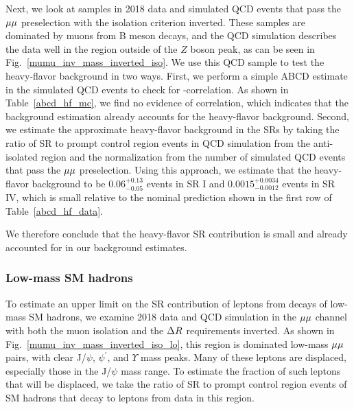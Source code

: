 Next, we look at samples in 2018 data and simulated QCD events that pass the ${\mu}{\mu}$ preselection with the isolation criterion inverted. These samples are dominated by muons from B meson decays, and the QCD simulation describes the data well in the region outside of the $Z$ boson peak, as can be seen in Fig.~\ref{mumu_inv_mass_inverted_iso}. We use this QCD sample to test the heavy-flavor background in two ways. First, we perform a simple ABCD estimate in the simulated QCD events to check for \ada-\adb correlation. As shown in Table~\ref{abcd_hf_mc}, we find no evidence of correlation, which indicates that the background estimation already accounts for the heavy-flavor background. Second, we estimate the approximate heavy-flavor background in the SRs by taking the ratio of SR to prompt control region events in QCD simulation from the anti-isolated region and the normalization from the number of simulated QCD events that pass the ${\mu}{\mu}$ preselection. Using this approach, we estimate that the heavy-flavor background to be $0.06^{+0.13}_{-0.05}$ events in SR I and $0.0015^{+0.0034}_{-0.0012}$ events in SR IV, which is small relative to the nominal prediction shown in the first row of Table~\ref{abcd_hf_data}.




We therefore conclude that the heavy-flavor SR contribution is small and already accounted for in our background estimates.

\subsubsection{Low-mass SM hadrons}
To estimate an upper limit on the SR contribution of leptons from decays of low-mass SM hadrons, we examine 2018 data and QCD simulation in the ${\mu}{\mu}$ channel with both the muon isolation and the $\Delta R$ requirements inverted. As shown in Fig.~\ref{mumu_inv_mass_inverted_iso_lo}, this region is dominated low-mass ${\mu}{\mu}$ pairs, with clear J/$\psi$, $\psi^\prime$, and $\Upsilon$ mass peaks. Many of these leptons are displaced, especially those in the J/$\psi$ mass range. To estimate the fraction of such leptons that will be displaced, we take the ratio of SR to prompt control region events of SM hadrons that decay to leptons from data in this region.



